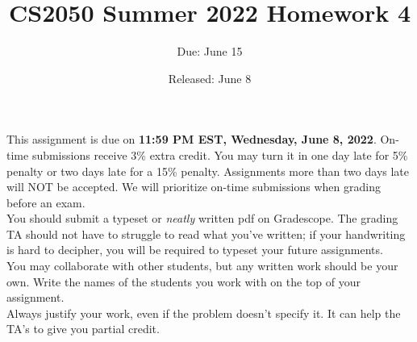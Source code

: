 \documentclass{article}
\title{CS2050 Summer 2022 Homework 4}
\author{Due: June 15}
\date{Released: June 8}
\begin{document}
\maketitle

This assignment is due on \textbf{11:59 PM EST, Wednesday, June 8, 2022}.  On-time submissions receive 3\% extra credit. You may turn it in one day late for 5\% penalty or two days late for a 15\% penalty. Assignments more than two days late will NOT be accepted.  We will prioritize on-time submissions when grading before an exam. \\ 

You should submit a typeset or \emph{neatly} written pdf on Gradescope.  The grading TA should not have to struggle to read what you've written; if your handwriting is hard to decipher, you will be required to typeset your future assignments.\\ 

You may collaborate with other students, but any written work should be your own. Write the names of the students you work with on the top of your assignment.\\

Always justify your work, even if the problem doesn't specify it. It can help the TA's to give you partial credit.
\end{document}
